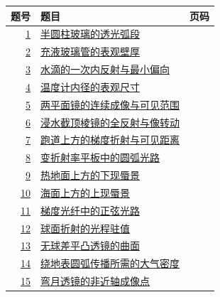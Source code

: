 \documentclass[UTF8,fontset=fandol,a4paper,11pt]{ctexart}
\begin{document}
\begin{longtable}{@{}r p{113mm} r@{}}\toprule 题号 & 题目 & 页码\\\midrule

\hyperref[q:1]{1} & \hyperref[q:1]{半圆柱玻璃的透光弧段} & \pageref{q:1} \\

\hyperref[q:2]{2} & \hyperref[q:2]{充液玻璃管的表观壁厚} & \pageref{q:2} \\

\hyperref[q:3]{3} & \hyperref[q:3]{水滴的一次内反射与最小偏向} & \pageref{q:3} \\

\hyperref[q:4]{4} & \hyperref[q:4]{温度计内径的表观尺寸} & \pageref{q:4} \\

\hyperref[q:5]{5} & \hyperref[q:5]{两平面镜的连续成像与可见范围} & \pageref{q:5} \\

\hyperref[q:6]{6} & \hyperref[q:6]{浸水截顶棱镜的全反射与像转动} & \pageref{q:6} \\

\hyperref[q:7]{7} & \hyperref[q:7]{跑道上方的梯度折射与可见距离} & \pageref{q:7} \\

\hyperref[q:8]{8} & \hyperref[q:8]{变折射率平板中的圆弧光路} & \pageref{q:8} \\

\hyperref[q:9]{9} & \hyperref[q:9]{热地面上方的下现蜃景} & \pageref{q:9} \\

\hyperref[q:10]{10} & \hyperref[q:10]{海面上方的上现蜃景} & \pageref{q:10} \\

\hyperref[q:11]{11} & \hyperref[q:11]{梯度光纤中的正弦光路} & \pageref{q:11} \\

\hyperref[q:12]{12} & \hyperref[q:12]{球面折射的光程驻值} & \pageref{q:12} \\

\hyperref[q:13]{13} & \hyperref[q:13]{无球差平凸透镜的曲面} & \pageref{q:13} \\

\hyperref[q:14]{14} & \hyperref[q:14]{绕地表圆弧传播所需的大气密度} & \pageref{q:14} \\

\hyperref[q:15]{15} & \hyperref[q:15]{弯月透镜的非近轴成像点} & \pageref{q:15} \\


\end{longtable}
\end{document}

